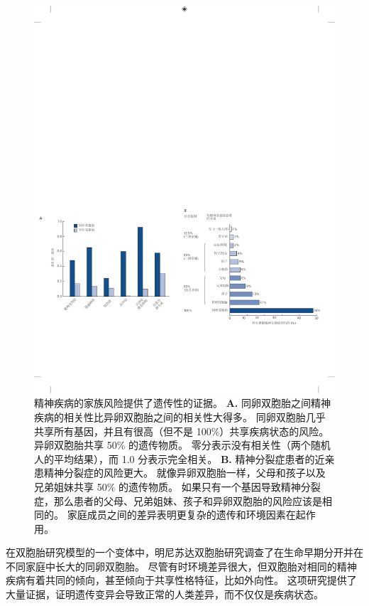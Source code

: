 \begin{figure}[htbp]
	\centering
	\includegraphics[width=1.0\linewidth]{chap02/fig_2_1}
	\caption{精神疾病的家族风险提供了遗传性的证据。
		\textbf{A.} 同卵双胞胎之间精神疾病的相关性比异卵双胞胎之间的相关性大得多。
		同卵双胞胎几乎共享所有基因，并且有很高（但不是 100\%）共享疾病状态的风险。
		异卵双胞胎共享 50\% 的遗传物质。
		零分表示没有相关性（两个随机人的平均结果），而 1.0 分表示完全相关\cite{mcgue1998genetic}。
		\textbf{B.} 精神分裂症患者的近亲患精神分裂症的风险更大。
		就像异卵双胞胎一样，父母和孩子以及兄弟姐妹共享 50\% 的遗传物质。
		如果只有一个基因导致精神分裂症，那么患者的父母、兄弟姐妹、孩子和异卵双胞胎的风险应该是相同的。 
		家庭成员之间的差异表明更复杂的遗传和环境因素在起作用\cite{gottesman1991schizophrenia}。}
	\label{fig:2_1}
\end{figure}


在双胞胎研究模型的一个变体中，明尼苏达双胞胎研究调查了在生命早期分开并在不同家庭中长大的同卵双胞胎。
尽管有时环境差异很大，但双胞胎对相同的精神疾病有着共同的倾向，甚至倾向于共享性格特征，比如外向性。
这项研究提供了大量证据，证明遗传变异会导致正常的人类差异，而不仅仅是疾病状态。


